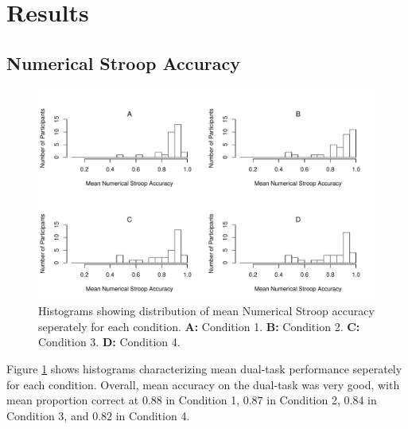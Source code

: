 \section*{Results} 
\subsection*{Numerical Stroop Accuracy} 
\begin{figure}[t]
    \centering \includegraphics[width=1.0\textwidth]{../figures/fig_exc_dual.pdf}
    \caption{
      Histograms showing distribution of mean Numerical Stroop accuracy
      seperately for each condition. 
      \textbf{A:} Condition 1.
      \textbf{B:} Condition 2.
      \textbf{C:} Condition 3.
      \textbf{D:} Condition 4.
    }
    \label{fig:exc_dual}
\end{figure}

Figure \ref{fig:exc_dual} shows histograms characterizing mean dual-task
performance seperately for each condition. Overall, mean accuracy on the
dual-task was very good, with mean proportion correct at $0.88$ in Condition 1,
$0.87$ in Condition 2, $0.84$ in Condition 3, and $0.82$ in Condition 4.

